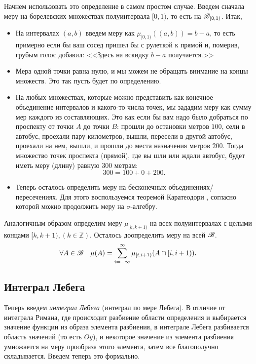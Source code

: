 \documentclass[../TV&MS.tex]{subfiles}
\begin{document}
Начнем использовать это определение в самом простом случае. Введем сначала меру на 
борелевских множествах полуинтервала $[0, 1)$, то есть на $\mathscr{B}_{[0, 1)}$. Итак, 
\begin{itemize}
	\item На интервалах $(a, b)$ введем меру как $\mu_{[0, 1)}((a, b)) = b - a$,
	то есть примерно если бы ваш сосед пришел бы с рулеткой к прямой и, померив, 
	грубым голос добавил: <<Здесь на вскидку $b-a$ получается.>>

	\item Мера одной точки равна нулю, и мы можем не обращать внимание на 
	концы множеств. Это так пусть будет по определению.
	
	\item На любых множествах, которые можно представить как конечное
	объединение интервалов и какого-то числа точек, мы зададим меру как 
	сумму мер каждого из составляющих. Это как если бы вам надо было 
	добраться по проспекту от точки $A$ до точки $B$: прошли до остановки 
	метров $100$, сели в автобус, проехали пару километров, вышли, пересели
	в другой автобус, проехали на нем, вышли, и прошли до места назначения
	метров $200$. Тогда множество точек проспекта (прямой), где вы шли или
	ждали автобус, будет иметь меру (длину) равную $300$ метрам:
	$$300 = 100 + 0 + 200.$$

	\item Теперь осталось определить меру на бесконечных объединениях/пересечениях. 
	Для этого воспользуемся теоремой Каратеодори , согласно 
	которой можно продолжить меру на $\sigma$-алгебру.
\end{itemize}

Аналогичным образом определим меру $\mu_{[k, k+1)}$ на всех полуинтервалах 
с целыми концами $[k, k+1), (k \in \mathbb{Z})$. Осталось доопределить меру на всей 
$\mathscr{B}$.
$$
	\forall A \in \mathscr{B} \quad\mu(A)=\sum\limits_{i=-\infty}^{\infty}\mu_{[i, i+1)}
	(A \cap [i, i+1)).
$$
 
\subsection{Интеграл Лебега} 
 
Теперь введем \emph{интеграл Лебега} (интеграл по мере Лебега). В отличие 
от интеграла Римана, где происходит разбиение области определения и выбирается
значение функции из образа элемента разбиения, в интеграле Лебега разбивается 
область значений (то есть $Oy$), и некоторое значение из элемента разбиения умножается 
на меру прообраза этого элемента, затем все благополучно складывается. Введем теперь 
это формально.
 
\end{document}
